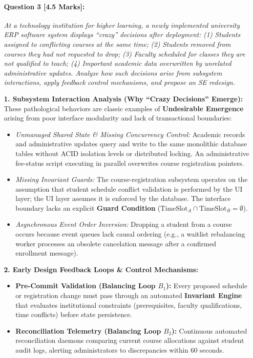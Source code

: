 \vspace{0.8em}
\paragraph{Question 3 [4.5 Marks]:}
\textit{At a technology institution for higher learning, a newly implemented university ERP software system displays ``crazy'' decisions after deployment:
(1) Students assigned to conflicting courses at the same time;
(2) Students removed from courses they had not requested to drop;
(3) Faculty scheduled for classes they are not qualified to teach;
(4) Important academic data overwritten by unrelated administrative updates.
Analyze how such decisions arise from subsystem interactions, apply feedback control mechanisms, and propose an SE redesign.}

\begin{tcolorbox}[colback=white,colframe=seSecondary,title={\small \textbf{Model Solution for Q3 (W24 Midsem):}}]
\textbf{1. Subsystem Interaction Analysis (Why ``Crazy Decisions'' Emerge):}
These pathological behaviors are classic examples of \textbf{Undesirable Emergence} arising from poor interface modularity and lack of transactional boundaries:
\begin{itemize}[leftmargin=1.5em, itemsep=1pt]
    \item \textit{Unmanaged Shared State \& Missing Concurrency Control:} Academic records and administrative updates query and write to the same monolithic database tables without ACID isolation levels or distributed locking. An administrative fee-status script executing in parallel overwrites course registration pointers.
    \item \textit{Missing Invariant Guards:} The course-registration subsystem operates on the assumption that student schedule conflict validation is performed by the UI layer; the UI layer assumes it is enforced by the database. The interface boundary lacks an explicit \textbf{Guard Condition} ($\text{TimeSlot}_A \cap \text{TimeSlot}_B = \emptyset$).
    \item \textit{Asynchronous Event Order Inversion:} Dropping a student from a course occurs because event queues lack causal ordering (e.g., a waitlist rebalancing worker processes an obsolete cancelation message after a confirmed enrollment message).
\end{itemize}

\textbf{2. Early Design Feedback Loops \& Control Mechanisms:}
\begin{itemize}[leftmargin=1.5em, itemsep=1pt]
    \item \textbf{Pre-Commit Validation (Balancing Loop $B_1$):} Every proposed schedule or registration change must pass through an automated \textbf{Invariant Engine} that evaluates institutional constraints (prerequisites, faculty qualifications, time conflicts) before state persistence.
    \item \textbf{Reconciliation Telemetry (Balancing Loop $B_2$):} Continuous automated reconciliation daemons comparing current course allocations against student audit logs, alerting administrators to discrepancies within 60 seconds.
\end{itemize}


\end{tcolorbox}
